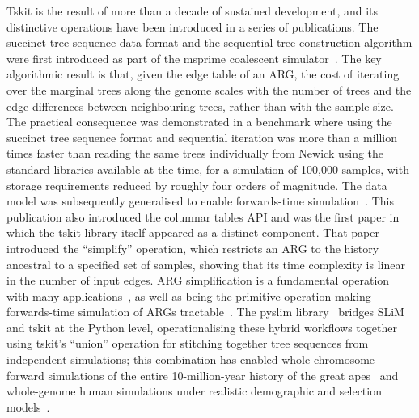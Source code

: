\documentclass{article}
\begin{document}
Tskit is the result of more than a decade of sustained development,
and its distinctive operations have been introduced in a
series of publications. The succinct tree
sequence data format and the sequential tree-construction algorithm
were first introduced as part of the msprime coalescent
simulator~\citep{kelleher2016efficient}.
The key algorithmic result is
that, given the edge table of an ARG, the cost of iterating over
the marginal trees along the genome scales with the number of trees
and the edge differences between neighbouring trees, rather than
with the sample size.
The practical consequence was demonstrated in a benchmark
where using the succinct tree sequence format and sequential
iteration was more than a million times faster than reading the
same trees individually from Newick using the standard libraries
available at the time, for a simulation of 100,000 samples, with
storage requirements reduced by roughly four orders of magnitude.
The data model was subsequently generalised to enable
forwards-time simulation~\citep{kelleher2018efficient}.
This publication
also introduced the columnar tables API and was the first paper in
which the tskit library itself appeared as a distinct component.
That paper introduced the ``simplify'' operation, which restricts an ARG to the
history ancestral to a specified set of samples, showing that its
time complexity is linear in the number of input edges.
ARG simplification is a fundamental operation with many
applications~\citep{wong2024general},
as well as being the primitive operation making forwards-time simulation of ARGs
tractable~\citep{haller2018tree}.
The pyslim library~\citep{gopalan2025bridging} bridges SLiM and
tskit at the Python level, operationalising these hybrid
workflows together using tskit's ``union'' operation for
stitching together tree sequences from independent simulations;
this combination has enabled whole-chromosome forward simulations
of the entire 10-million-year history of the great
apes~\citep{rodrigues2024shared} and
whole-genome human simulations under realistic demographic and selection
models~\citep{haller2025simHumanity}.
\end{document}
